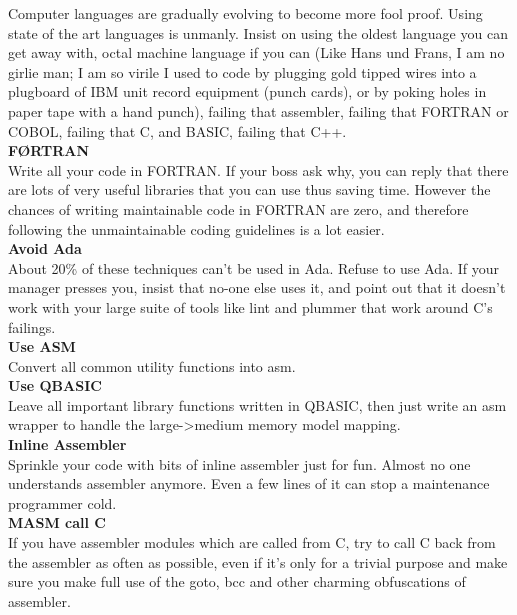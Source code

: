 \documentclass[11pt,twoside,a4paper]{article}
\begin{document}
Computer languages are gradually evolving to become more fool proof. Using state of the art languages is unmanly. Insist on using the oldest language you can get away with, octal machine language if you can (Like Hans und Frans, I am no girlie man; I am so virile I used to code by plugging gold tipped wires into a plugboard of IBM unit record equipment (punch cards), or by poking holes in paper tape with a hand punch), failing that assembler, failing that FORTRAN or COBOL, failing that C, and BASIC, failing that C++.~\\ 

\textbf{F\O RTRAN}~\\
Write all your code in FORTRAN. If your boss ask why, you can reply that there are lots of very useful libraries that you can use thus saving time. However the chances of writing maintainable code in FORTRAN are zero, and therefore following the unmaintainable coding guidelines is a lot easier.~\\ 

\textbf{Avoid Ada}~\\
About 20\% of these techniques can't be used in Ada. Refuse to use Ada. If your manager presses you, insist that no-one else uses it, and point out that it doesn't work with your large suite of tools like lint and plummer that work around C's failings.~\\ 

\textbf{Use ASM}~\\
Convert all common utility functions into asm.~\\ 

\textbf{Use QBASIC}~\\
Leave all important library functions written in QBASIC, then just write an asm wrapper to handle the large->medium memory model mapping.~\\ 

\textbf{Inline Assembler}~\\
Sprinkle your code with bits of inline assembler just for fun. Almost no one understands assembler anymore. Even a few lines of it can stop a maintenance programmer cold.~\\ 

\textbf{MASM call C}~\\
If you have assembler modules which are called from C, try to call C back from the assembler as often as possible, even if it's only for a trivial purpose and make sure you make full use of the goto, bcc and other charming obfuscations of assembler.~\\ 
\end{document}
